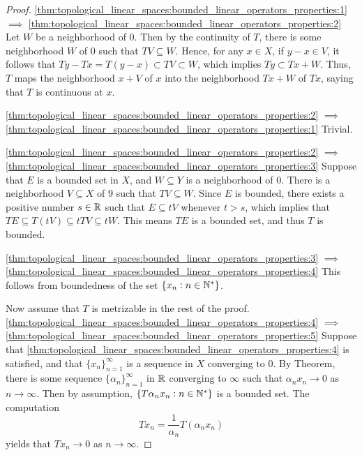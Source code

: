 \begin{proof}
\ref{thm:topological_linear_spaces:bounded_linear_operators_properties:1}
$\implies$ 
\ref{thm:topological_linear_spaces:bounded_linear_operators_properties:2}
Let $W$ be a neighborhood of $0$. 
Then by the continuity of $T$, there is some neighborhood $W$ of $0$ 
such that $TV \subseteq W$. 
Hence, for any $x \in X$, if $y - x \in V$, it follows that $Ty - Tx = 
T(y - x) \subset TV \subset W$, which implies $Ty \subset Tx + W$. 
Thus, $T$ maps the neighborhood $x + V$ of $x$ into the neighborhood $Tx+W$ 
of $Tx$, saying that $T$ is continuous at $x$. 

\ref{thm:topological_linear_spaces:bounded_linear_operators_properties:2}
$\implies$ 
\ref{thm:topological_linear_spaces:bounded_linear_operators_properties:1}
Trivial. 

\ref{thm:topological_linear_spaces:bounded_linear_operators_properties:2}
$\implies$ 
\ref{thm:topological_linear_spaces:bounded_linear_operators_properties:3}
Suppose that $E$ is a bounded set in $X$, and $W \subseteq Y$ is a 
neighborhood of $0$. 
There is a neighborhood $V\subseteq X$ of $9$ such that $TV \subseteq W$. 
Since $E$ is bounded, there exists a positive number $s \in \mathbb{R}$ such that 
$E \subseteq tV$ whenever $t > s$, which implies that $TE \subseteq T(tV) 
\subseteq t TV \subseteq t W$. 
This means $TE$ is a bounded set, and thus $T$ is bounded. 

\ref{thm:topological_linear_spaces:bounded_linear_operators_properties:3}
$\implies$ 
\ref{thm:topological_linear_spaces:bounded_linear_operators_properties:4}
This follows from boundedness of the set $\{x_n: n \in \mathbb{N}^\ast\}$.

Now assume that $T$ is metrizable in the rest of the proof. 
\ref{thm:topological_linear_spaces:bounded_linear_operators_properties:4}
$\implies$ 
\ref{thm:topological_linear_spaces:bounded_linear_operators_properties:5}
Suppose that \ref{thm:topological_linear_spaces:bounded_linear_operators_properties:4}
is satisfied, and that $\{ x_n \}_{n=1}^{\infty}$ is a sequence in $X$ 
converging to $0$. 
By Theorem, there is some sequence $\{ \alpha_n \}_{n=1}^{\infty}$ in $\mathbb{R}$ 
converging to $\infty$ such that $\alpha_n x_n \to 0$ as $n \to \infty$. 
Then by assumption, $\{T \alpha_n x_n: n \in \mathbb{N}^\ast\}$ is a bounded set. 
The computation 
\begin{equation*}
    Tx_n = \frac{1}{\alpha_n} T(\alpha_n x_n)
\end{equation*}
yields that $Tx_n \to 0$ as $n \to \infty$. 


\end{proof}
